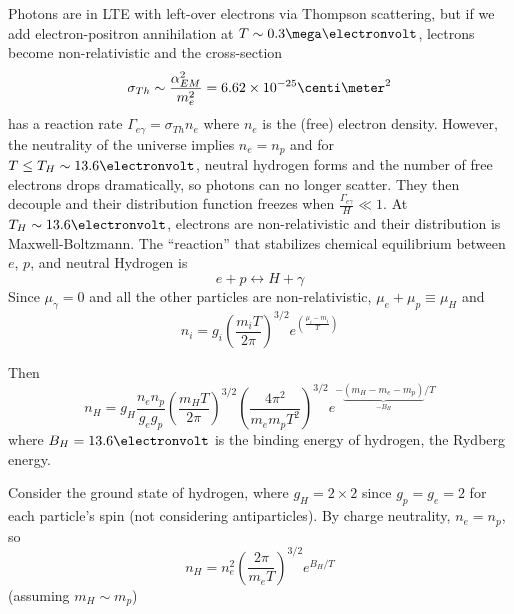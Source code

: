 \documentclass[a4paper,twoside,master.tex]{subfiles}
\begin{document}

Photons are in LTE with left-over electrons via Thompson scattering, but if we add electron-positron annihilation at $ T \sim 0.3 \mega\electronvolt $, lectrons become non-relativistic and the cross-section
\begin{equation}
    \sigma_{Th} \sim \frac{\alpha^2_{EM}}{m_e^2} = 6.62 \times 10^{-25} \centi\meter^2
\end{equation}
has a reaction rate $ \Gamma_{e \gamma} = \sigma_{Th} n_e $ where $ n_e $ is the (free) electron density. However, the neutrality of the universe implies $ n_e = n_p $ and for $ T \leq T_H \sim 13.6 \electronvolt $, neutral hydrogen forms and the number of free electrons drops dramatically, so photons can no longer scatter. They then decouple and their distribution function freezes when $ \frac{\Gamma_{e \gamma}}{H} \ll 1 $. At $ T_H \sim 13.6 \electronvolt $, electrons are non-relativistic and their distribution is Maxwell-Boltzmann. The ``reaction'' that stabilizes chemical equilibrium between $ e $, $ p $, and neutral Hydrogen is
\begin{equation}
    e + p \leftrightarrow H + \gamma 
\end{equation}
Since $ \mu_{\gamma} = 0 $ and all the other particles are non-relativistic, $ \mu_e + \mu_p \equiv \mu_H $ and
\begin{equation}
    n_i = g_i \left( \frac{m_i T}{2 \pi} \right)^{3/2} e^{\left( \frac{\mu_i - m_i}{T} \right)}
\end{equation}

Then
\begin{equation}
    n_H = g_H \frac{n_e n_p}{g_e g_p} \left( \frac{m_H T}{2 \pi} \right)^{3/2} \left( \frac{4 \pi^2}{m_e m_p T^2} \right)^{3/2} e^{-\underbrace{(m_H - m_e - m_p)}_{- B_H}/T}
\end{equation}
where $ B_H = 13.6 \electronvolt $ is the binding energy of hydrogen, the Rydberg energy.

Consider the ground state of hydrogen, where $ g_H = 2 \times 2 $ since $ g_p = g_e = 2 $ for each particle's spin (not considering antiparticles). By charge neutrality, $ n_e = n_p $, so
\begin{equation}
    n_H = n_e^2 \left( \frac{2 \pi}{m_e T} \right)^{3/2} e^{B_H / T}
\end{equation}
(assuming $ m_H \sim m_p $)
\end{document}
